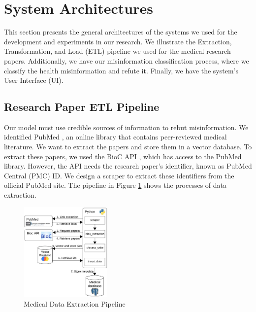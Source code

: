 
\section{System Architectures}

This section presents the general architectures of the systems we used for the development and experiments in our research. We illustrate the Extraction, Transformation, and Load (ETL) pipeline we used for the medical research papers. Additionally, we have our misinformation classification process, where we classify the health misinformation and refute it. Finally, we have the system's User Interface (UI).

\subsection{Research Paper ETL Pipeline}

Our model must use credible sources of information to rebut misinformation. We identified PubMed \cite{pubmed}, an online library that contains peer-reviewed medical literature. We want to extract the papers and store them in a vector database. To extract these papers, we used the BioC API \cite{bioinformatics}, which has access to the PubMed library. However, the API needs the research paper's identifier, known as PubMed Central (PMC) ID. We design a scraper to extract these identifiers from the official PubMed site. The pipeline in Figure \ref{fig:etl} shows the processes of data extraction. 

\begin{figure}[h]
	\begin{center}
		\includegraphics[width=0.4\textwidth]{figures/ETL_Pipeline.jpeg} %
	\end{center}
	\caption{Medical Data Extraction Pipeline} %
	\label{fig:etl}
\end{figure}

